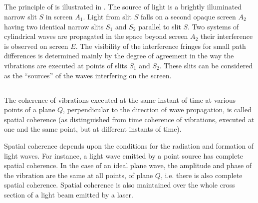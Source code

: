\subsection{}\label{32.2.8} The principle of  is illustrated in . The source of light is a brightly illuminated
narrow slit $S$ in screen $A_{1}$. Light from slit $S$ falls on a second opaque screen $A_{2}$ having two identical narrow slits $S_{1}$ and $S_{2}$ parallel to slit $S$. Two systems of cylindrical waves are propagated in the space beyond screen $A_{2}$ their interference is observed on screen $E$. The visibility of the interference fringes for small path differences is determined mainly by the degree of agreement in the way the vibrations are executed at points of 
slits $S_{1}$ and $S_{2}$. These slits can be considered as the ``sources'' of the waves interfering on the screen.

\subsection{}\label{32.2.9} The coherence of vibrations executed at the same instant of time at various points of a plane $Q$, perpendicular to the direction of wave propagation, is called spatial coherence (as distinguished from time coherence of vibrations, executed at one and the same point, but at different instants of time).

Spatial coherence depends upon the conditions for the radiation and formation of light waves. For instance, a light wave emitted by a point source has complete spatial coherence. In the case of an ideal plane wave, the amplitude and phase of the vibration are the same at all points, of plane $Q$, i.e. there is also complete spatial coherence. Spatial coherence is also maintained over the whole cross section of a light beam emitted by a laser.

